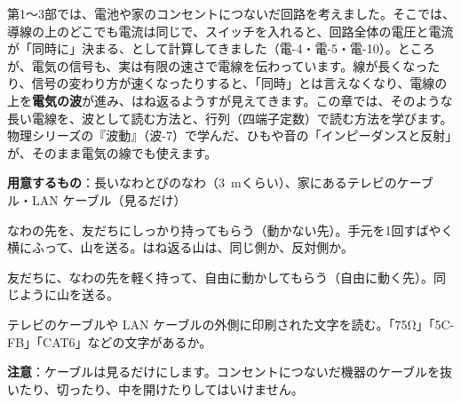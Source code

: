 \noindent 第1〜3部では、電池や家のコンセントにつないだ回路を考えました。そこでは、導線の上のどこでも電流は同じで、スイッチを入れると、回路全体の電圧と電流が「同時に」決まる、として計算してきました（電-4・電-5・電-10）。ところが、電気の信号も、実は有限の速さで電線を伝わっています。線が長くなったり、信号の変わり方が速くなったりすると、「同時」とは言えなくなり、電線の上を\textbf{電気の波}が進み、はね返るようすが見えてきます。この章では、そのような長い電線を、波として読む方法と、行列（四端子定数）で読む方法を学びます。物理シリーズの『波動』（波-7）で学んだ、ひもや音の「インピーダンスと反射」が、そのまま電気の線でも使えます。

\begin{yattemiyou}
\textbf{用意するもの}：長いなわとびのなわ（\qty{3}{m}くらい）、家にあるテレビのケーブル・LAN ケーブル（見るだけ）\par\vspace{2pt}
\noindent\begin{minipage}[c]{0.64\linewidth}
\begin{enumerate}[label={\bkcircled[bkGreen]{\arabic*}}, leftmargin=2.4\zw, itemsep=1pt, topsep=0pt]
\item なわの先を、友だちにしっかり持ってもらう（動かない先）。手元を1回すばやく横にふって、山を送る。はね返る山は、同じ側か、反対側か。
\item 友だちに、なわの先を軽く持って、自由に動かしてもらう（自由に動く先）。同じように山を送る。
\item テレビのケーブルや LAN ケーブルの外側に印刷された文字を読む。「75Ω」「5C-FB」「CAT6」などの文字があるか。
\end{enumerate}
\end{minipage}\hfill
\begin{minipage}[c]{0.33\linewidth}\centering
{}
\end{minipage}\par\vspace{2pt}
\noindent\textbf{注意}：ケーブルは見るだけにします。コンセントにつないだ機器のケーブルを抜いたり、切ったり、中を開けたりしてはいけません。
\end{yattemiyou}

